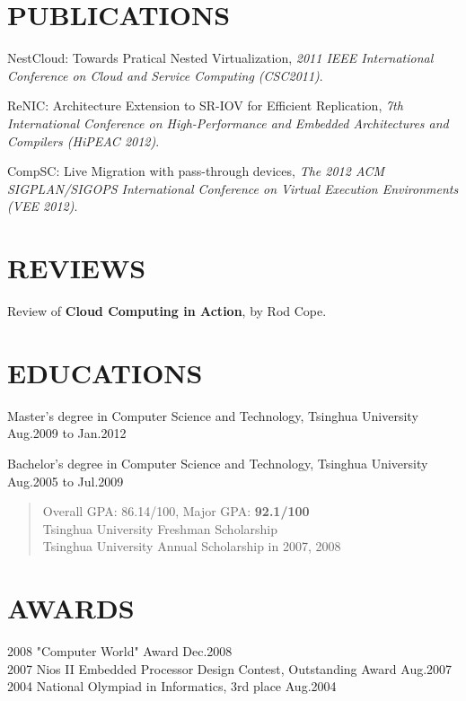 \documentclass[11pt]{res} %
\begin{document}
\begin{resume}
\section{PUBLICATIONS}
NestCloud: Towards Pratical Nested Virtualization, \emph{2011 IEEE
  International Conference on Cloud and Service Computing (CSC2011)}.

ReNIC: Architecture Extension to SR-IOV for Efficient Replication,
\emph{7th International Conference on High-Performance and Embedded
  Architectures and Compilers (HiPEAC 2012)}.

CompSC: Live Migration with pass-through devices, \emph{The 2012 ACM
  SIGPLAN/SIGOPS International Conference on Virtual Execution
  Environments (VEE 2012)}.

\section{REVIEWS}
Review of \textbf{Cloud Computing in Action}, by Rod Cope.

\section{EDUCATIONS}
Master's degree in Computer Science and Technology, Tsinghua University \\
\hspace*{\fill} Aug.2009 to Jan.2012

Bachelor's degree in Computer Science and Technology, Tsinghua University \\
\hspace*{\fill} Aug.2005 to Jul.2009
\begin{quote}
Overall GPA: 86.14/100, Major GPA: \textbf{92.1/100} \\
Tsinghua University Freshman Scholarship \\
Tsinghua University Annual Scholarship in 2007, 2008 \\
\end{quote}

\section{AWARDS}
2008 "Computer World" Award \hfill Dec.2008 \\
2007 Nios II Embedded Processor Design Contest, Outstanding Award \hfill Aug.2007 \\
2004 National Olympiad in Informatics, 3rd place \hfill Aug.2004

\end{resume}
\end{document}
